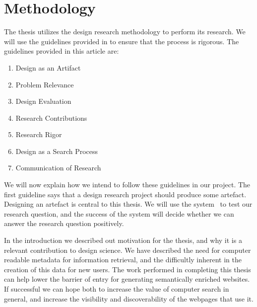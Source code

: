
\chapter{Methodology} %

\label{Methodology} %


The thesis utilizes the design research methodology to perform its research.
We will use the guidelines provided in \citet{Hevner2004} to ensure that the process is rigorous.
The guidelines provided in this article are:
\begin{enumerate}
	\item \label{gl1}Design as an Artifact
	\item \label{gl2}Problem Relevance
	\item \label{gl3}Design Evaluation
	\item \label{gl4}Research Contributions
	\item \label{gl5}Research Rigor
	\item \label{gl6}Design as a Search Process
	\item \label{gl7}Communication of Research
\end{enumerate}

We will now explain how we intend to follow these guidelines in our project.
The first guideline says that a design research project should produce some artefact.
Designing an artefact is central to this thesis.
We will use the system \theartefact\ to test our research question,
and the success of the system will decide whether we can answer the research question positively.

In the introduction we described out motivation for the thesis, and why it is a relevant contribution to design science.
We have described the need for computer readable metadata for information retrieval,
and the difficultly inherent in the creation of this data for new users.
The work performed in completing this thesis can help lower the barrier of entry for generating semantically enriched websites.
If successful we can hope both to increase the value of computer search in general, and increase the visibility and
discoverability of the webpages that use it.

